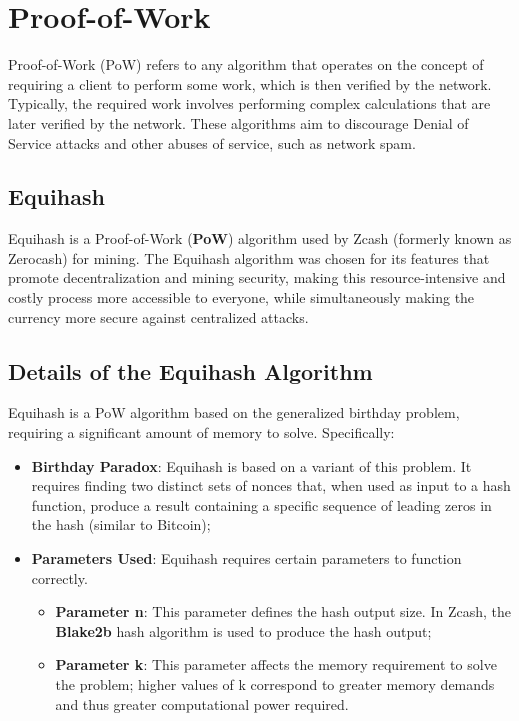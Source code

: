 \section{Proof-of-Work}

Proof-of-Work (PoW) refers to any algorithm that operates on the concept of requiring a client to perform some work, which is then verified by the network. Typically, the required work involves performing complex calculations that are later verified by the network. These algorithms aim to discourage Denial of Service attacks and other abuses of service, such as network spam.

\subsection{Equihash}

Equihash is a Proof-of-Work (\textbf{PoW}) algorithm used by Zcash (formerly known as Zerocash) for mining. The Equihash algorithm was chosen for its features that promote decentralization and mining security, making this resource-intensive and costly process more accessible to everyone, while simultaneously making the currency more secure against centralized attacks.

\subsection{Details of the Equihash Algorithm}

Equihash is a PoW algorithm based on the generalized birthday problem, requiring a significant amount of memory to solve. Specifically:
\begin{itemize}
    \item \textbf{Birthday Paradox}: Equihash is based on a variant of this problem. It requires finding two distinct sets of nonces that, when used as input to a hash function, produce a result containing a specific sequence of leading zeros in the hash (similar to Bitcoin);
    \item \textbf{Parameters Used}: Equihash requires certain parameters to function correctly.
    \begin{itemize}
        \item \textbf{Parameter n}: This parameter defines the hash output size. In Zcash, the \textbf{Blake2b} hash algorithm is used to produce the hash output;
        \item \textbf{Parameter k}: This parameter affects the memory requirement to solve the problem; higher values of k correspond to greater memory demands and thus greater computational power required.
    \end{itemize}
\end{itemize}


